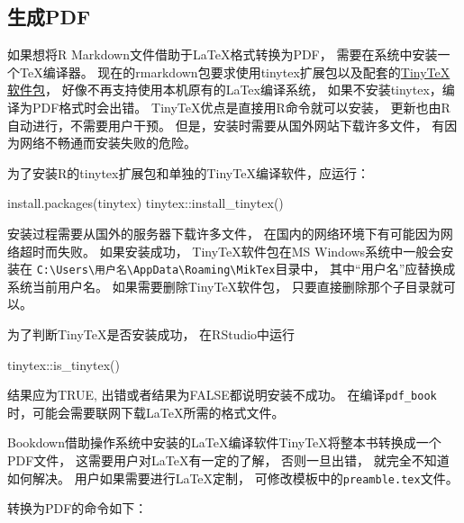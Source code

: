 \documentclass[
]{book}
\newenvironment{Shaded}{\begin{snugshade}}{\end{snugshade}}
\newcommand{\FunctionTok}[1]{\textcolor[rgb]{0.00,0.00,0.00}{#1}}
\newcommand{\NormalTok}[1]{#1}
\newcommand{\SpecialCharTok}[1]{\textcolor[rgb]{0.00,0.00,0.00}{#1}}
\newcommand{\StringTok}[1]{\textcolor[rgb]{0.31,0.60,0.02}{#1}}
\begin{document}
\hypertarget{usage-pdfbook}{%
\subsection{生成PDF}\label{usage-pdfbook}}

如果想将R Markdown文件借助于LaTeX格式转换为PDF，
需要在系统中安装一个TeX编译器。
现在的rmarkdown包要求使用tinytex扩展包以及配套的\href{https://yihui.name/tinytex/}{TinyTeX软件包}，
好像不再支持使用本机原有的LaTex编译系统，
如果不安装tinytex，编译为PDF格式时会出错。
TinyTeX优点是直接用R命令就可以安装，
更新也由R自动进行，不需要用户干预。
但是，安装时需要从国外网站下载许多文件，
有因为网络不畅通而安装失败的危险。

为了安装R的tinytex扩展包和单独的TinyTeX编译软件，应运行：

\begin{Shaded}
\begin{Highlighting}[]
\FunctionTok{install.packages}\NormalTok{(}\StringTok{\textquotesingle{}tinytex\textquotesingle{}}\NormalTok{)}
\NormalTok{tinytex}\SpecialCharTok{::}\FunctionTok{install\_tinytex}\NormalTok{()}
\end{Highlighting}
\end{Shaded}

安装过程需要从国外的服务器下载许多文件，
在国内的网络环境下有可能因为网络超时而失败。
如果安装成功，
TinyTeX软件包在MS Windows系统中一般会安装在 \texttt{C:\textbackslash{}Users\textbackslash{}用户名\textbackslash{}AppData\textbackslash{}Roaming\textbackslash{}MikTex}目录中，
其中``用户名''应替换成系统当前用户名。
如果需要删除TinyTeX软件包， 只要直接删除那个子目录就可以。

为了判断TinyTeX是否安装成功， 在RStudio中运行

\begin{Shaded}
\begin{Highlighting}[]
\NormalTok{tinytex}\SpecialCharTok{::}\FunctionTok{is\_tinytex}\NormalTok{()}
\end{Highlighting}
\end{Shaded}

结果应为TRUE, 出错或者结果为FALSE都说明安装不成功。
在编译\texttt{pdf\_book}时，可能会需要联网下载LaTeX所需的格式文件。

Bookdown借助操作系统中安装的LaTeX编译软件TinyTeX将整本书转换成一个PDF文件，
这需要用户对LaTeX有一定的了解，
否则一旦出错，
就完全不知道如何解决。
用户如果需要进行LaTeX定制，
可修改模板中的\texttt{preamble.tex}文件。

转换为PDF的命令如下：
\end{document}
